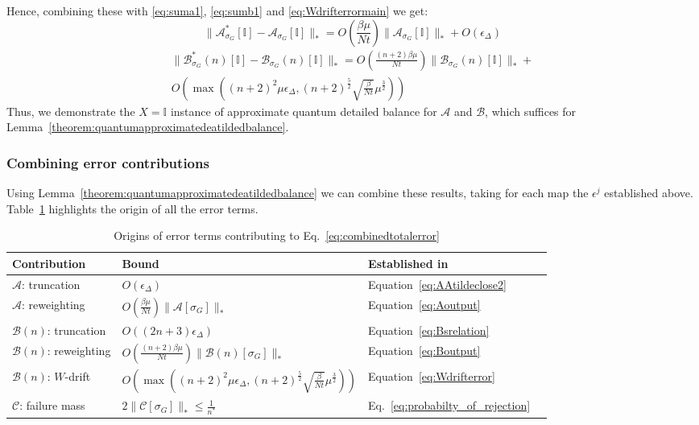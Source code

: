 \documentclass[aps,floatfix,10pt,amssymb,amsfont,amsmath,superscriptaddress,float,nofootinbib,longbibliography,nobalancelastpage,twocolumn]{revtex4-2}
\begin{document}
Hence, combining these with \eqref{eq:suma1}, \eqref{eq:sumb1} and \eqref{eq:Wdrifterrormain} we get:
\begin{equation}
    \|\mathcal{A}^*_{\sigma_G}[\mathbb{I}] - \mathcal{A}_{\sigma_G}[\mathbb{I}]\|_* = O\!\left(\frac{\beta\mu}{Nt}\right)\|\mathcal{A}_{\sigma_G}[\mathbb{I}]\|_* + O\!\left(\epsilon_{\Delta}\right)
\end{equation}
\begin{multline}
    \|\mathcal{B}^*_{\sigma_G}(n)[\mathbb{I}] - \mathcal{B}_{\sigma_G}(n)[\mathbb{I}]\|_* = O\left(\frac{(n+2)\beta\mu}{Nt} \right)\|\mathcal{B}_{\sigma_G}(n)[\mathbb{I}]\|_* +\\O\left(\max\left((n+2)^2\mu\epsilon_{\Delta},(n+2)^{\frac{5}{2}}\sqrt{\frac{\beta }{Nt}}\mu^{\frac{3}{2}}\right)\right) 
\end{multline}
Thus, we demonstrate the $X=\mathbb{I}$ instance of approximate quantum detailed balance for $\mathcal{A}$ and $\mathcal{B}$, which suffices for Lemma~\ref{theorem:quantumapproximatedeatildedbalance}.
\subsubsection{Combining error contributions}
\label{sec:combine}
Using Lemma~\ref{theorem:quantumapproximatedeatildedbalance} we can combine these results, taking for each map the $\epsilon^j$ established above. Table~\ref{tab:contributions} highlights the origin of all the error terms.
\begin{table}
\begin{tabular}{llll}
\hline\hline
Contribution & Bound & Established in \\
\hline
$\mathcal{A}$: truncation & $O(\epsilon_{\Delta})$ &
Equation~\eqref{eq:AAtildeclose2} \\
$\mathcal{A}$: reweighting &  $O(\frac{\beta\mu}{Nt})\|\mathcal{A}[\sigma_G]\|_*$ & Equation~\eqref{eq:Aoutput} \\
$\mathcal{B}(n)$: truncation  & $O((2n+3)\epsilon_{\Delta})$ & Equation~\eqref{eq:Bsrelation} \\
$\mathcal{B}(n)$: reweighting & $O(\frac{(n+2)\beta\mu}{Nt})\|\mathcal{B}(n)[\sigma_G]\|_*$ &  Equation~\eqref{eq:Boutput}\\
$\mathcal{B}(n)$: $W$-drift  & $O\left(\max\left((n+2)^2\mu\epsilon_{\Delta},(n+2)^{\frac{5}{2}}\sqrt{\frac{\beta }{Nt}}\mu^{\frac{3}{2}}\right)\right) $ & Equation~\eqref{eq:Wdrifterror}\\
$\mathcal{C}$: failure mass & $2\|\mathcal{C}[\sigma_G]\|_* \leq \frac{1}{n^*}$ &  Eq.~\eqref{eq:probabilty_of_rejection} \\
\hline\hline
\end{tabular}
\caption{\label{tab:contributions} Origins of error terms contributing to Eq.~\eqref{eq:combinedtotalerror}}
\end{table}
\end{document}
